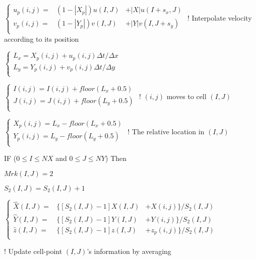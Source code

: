 \documentclass{article}
\theoremstyle{plain}\newtheorem{definition}{\sc{Definition}}
\theoremstyle{defination}\newtheorem{example}{Example}[section]
\numberwithin{equation}{section}
\numberwithin{table}{section}
\begin{document}
{{{{ \hspace{1.5cm}	$\left\{
  \begin{array}{lll}
u_p(i,j)=&(1-|X_p|)u(I,J)&+|X|u(I+s_x,J)\\
v_p(i,j)=&(1-|Y_p|)v(I,J)&+|Y|v(I,J+s_y)\\
	\end{array}
	\right.$
 \hspace{0.5cm}
  \color{black!60} ! Interpolate velocity according to its position \color{black!80}


 \hspace{1.5cm}	$\left\{
  \begin{array}{l}
	L_x=X_p(i,j)+u_p(i,j)\Delta t/ \Delta x\\
    L_y=Y_p(i,j)+v_p(i,j)\Delta t/ \Delta y\\
	\end{array}
	\right.$

 \hspace{1.5cm}	$\left\{
  \begin{array}{l}
	I(i,j)=I(i,j)+floor(L_x+0.5)\\
    J(i,j)=J(i,j)+floor(L_y+0.5)\\
	\end{array}
	\right.$
  { \color{black!60} \hspace{2.3cm}
! $(i,j)$ moves to cell $(I,J)$} {\color{black!80}

 \hspace{1.5cm}	$\left\{
  \begin{array}{l}
	X_p(i,j)=L_x-floor(L_x+0.5)\\
    Y_p(i,j)=L_y-floor(L_y+0.5)\\
	\end{array}
	\right.$
	{ \color{black!60} \hspace{2.5cm}
! The relative location in $(I,J)$} {\color{black!80}

\vspace{0.1cm}
\hspace{1.5cm} \color{black!60!blue!80} IF
\color{black!70} ($0 \leqslant I \leqslant NX$ and $0 \leqslant J \leqslant NY$)
\color{black!60!blue!80} Then
\color{black!80}

\hspace{2.0cm} $Mrk(I,J)=2$

\hspace{2.0cm} $S_2(I,J)=S_2(I,J)+1$

\hspace{2.0cm}	$\left\{
  \begin{array}{rlr}
	\hat{X}(I,J)=&\{[S_2(I,J)-1]X(I,J)&+X(i,j)\}/S_2(I,J)\\  
	\hat{Y}(I,J)=&\{[S_2(I,J)-1]Y(I,J)&+Y(i,j)\}/S_2(I,J)\\
	\hat{z}(I,J)=&\{[S_2(I,J)-1]z(I,J)&+z_p(i,j)\}/S_2(I,J)\\
	\end{array}
	\right.$
  }
  \hspace{0cm}
  \begin{minipage}{7cm}
	\color{black!60}
! Update cell-point $(I,J)$'s 
 information by averaging 


\end{minipage}}}}}}
\end{document}

